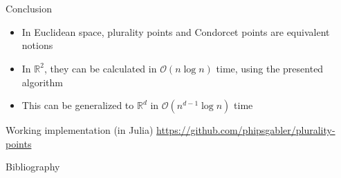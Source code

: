 \documentclass{beamer}
\newcommand{\RR}{\mathbb{R}}
\begin{document}
\section*{}
\begin{frame}{Conclusion}
  \begin{itemize}
  \item In Euclidean space, plurality points and Condorcet points are equivalent notions
  \item In \(\RR^2\), they can be calculated in \(\mathcal{O}(n \log n)\) time, using the presented
    algorithm
  \item This can be generalized to \(\RR^d\) in \(\mathcal{O}(n^{d-1} \log n)\) time
  \end{itemize}

  \vspace{1cm}
  \begin{block}{Working implementation (in Julia)}
    \url{https://github.com/phipsgabler/plurality-points}
  \end{block}
\end{frame}


\begin{frame}{Bibliography}
  \renewcommand*{\bibfont}{\small}
  \nocite{*}
  \printbibliography
\end{frame}
\end{document}
